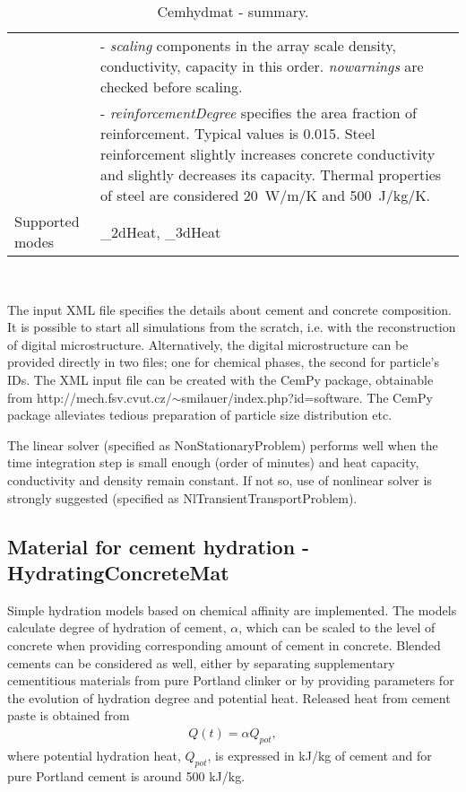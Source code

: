 \documentclass[a4paper]{article}
\newcommand{\param}[1]{{\it #1}}
\newenvironment{mmt}{\begin{tabular}{|l|p{9cm}|}}{\end{tabular}\\}
\newenvironment{mmt}{\begin{tabular}{|l|l|}}{\end{tabular}\\}
\begin{document}
\begin{table}[!htb]
\begin{mmt}
&- \param{scaling} components in the array scale density, conductivity, capacity in this order. \param{nowarnings} are checked before scaling.\\
&- \param{reinforcementDegree} specifies the area fraction of reinforcement. Typical values is 0.015. Steel reinforcement slightly increases concrete conductivity and slightly decreases its capacity. Thermal properties of steel are considered 20~W/m/K and 500~J/kg/K.\\
Supported modes& \_2dHeat, \_3dHeat\\
\hline
\end{mmt}
\caption{Cemhydmat - summary.}
\label{Cemhydmat_table}
\end{table}

The input XML file specifies the details about cement and concrete composition.
It is possible to start all simulations from the scratch, i.e. with the
reconstruction of digital microstructure. Alternatively, the digital
microstructure can be provided directly in two files; one for chemical phases,
the second for particle's IDs. The XML input file can be created with the CemPy
package, obtainable from
http://mech.fsv.cvut.cz/$\sim$smilauer/index.php?id=software. The CemPy package
alleviates tedious preparation of particle size distribution etc.

The linear solver (specified as NonStationaryProblem) performs well when the
time integration step is small enough (order of minutes) and heat capacity,
conductivity and density remain constant. If not so, use of nonlinear solver is
strongly suggested (specified as NlTransientTransportProblem).

\clearpage

\subsection{Material for cement hydration - HydratingConcreteMat}
\label{Affinity1}
Simple hydration models based on chemical affinity are implemented. The models calculate degree of hydration of cement, $\alpha$, which can be scaled to the level of concrete when providing corresponding amount of cement in concrete. Blended cements can be considered as well, either by separating supplementary cementitious materials from pure Portland clinker or by providing parameters for the evolution of hydration degree and potential heat. Released heat from cement paste is obtained from
\begin{eqnarray}
Q(t) = \alpha Q_{pot},
\end{eqnarray}
where potential hydration heat, $Q_{pot}$, is expressed in kJ/kg of cement and for pure Portland cement is around 500 kJ/kg.
\end{document}
